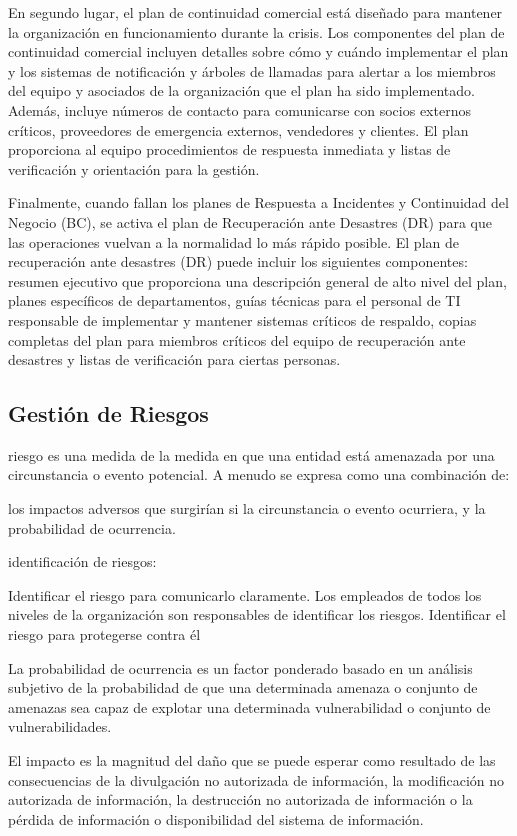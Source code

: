 En segundo lugar, el plan de continuidad comercial está diseñado para mantener la organización en funcionamiento durante la crisis. Los componentes del plan de continuidad comercial incluyen detalles sobre cómo y cuándo implementar el plan y los sistemas de notificación y árboles de llamadas para alertar a los miembros del equipo y asociados de la organización que el plan ha sido implementado. Además, incluye números de contacto para comunicarse con socios externos críticos, proveedores de emergencia externos, vendedores y clientes. El plan proporciona al equipo procedimientos de respuesta inmediata y listas de verificación y orientación para la gestión.

Finalmente, cuando fallan los planes de Respuesta a Incidentes y Continuidad del Negocio (BC), se activa el plan de Recuperación ante Desastres (DR) para que las operaciones vuelvan a la normalidad lo más rápido posible. El plan de recuperación ante desastres (DR) puede incluir los siguientes componentes: resumen ejecutivo que proporciona una descripción general de alto nivel del plan, planes específicos de departamentos, guías técnicas para el personal de TI responsable de implementar y mantener sistemas críticos de respaldo, copias completas del plan para miembros críticos del equipo de recuperación ante desastres y listas de verificación para ciertas personas.
\subsection{Gestión de Riesgos}

 riesgo es una medida de la medida en que una entidad está amenazada por una circunstancia o evento potencial. A menudo se expresa como una combinación de:

los impactos adversos que surgirían si la circunstancia o evento ocurriera, y
la probabilidad de ocurrencia.

identificación de riesgos:

Identificar el riesgo para comunicarlo claramente.
Los empleados de todos los niveles de la organización son responsables de identificar los riesgos.
Identificar el riesgo para protegerse contra él


La probabilidad de ocurrencia es un factor ponderado basado en un análisis subjetivo de la probabilidad de que una determinada amenaza o conjunto de amenazas sea capaz de explotar una determinada vulnerabilidad o conjunto de vulnerabilidades.

 El impacto es la magnitud del daño que se puede esperar como resultado de las consecuencias de la divulgación no autorizada de información, la modificación no autorizada de información, la destrucción no autorizada de información o la pérdida de información o disponibilidad del sistema de información.





